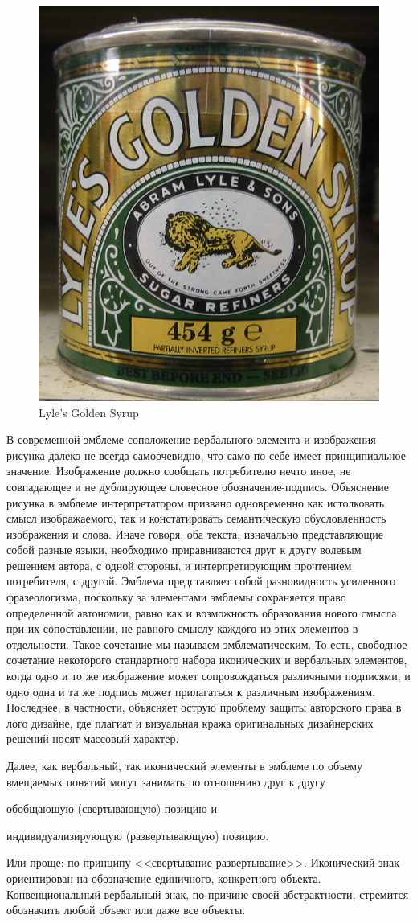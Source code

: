 \begin{figure}
  \centering
  \includegraphics[width=.5\linewidth]{images/goldensyrop}
  \caption{Lyle’s Golden Syrup}
  \label{fig:syrop}
\end{figure}

В современной эмблеме соположение вербального элемента и изображения-рисунка далеко не всегда
самоочевидно, что само по себе имеет принципиальное значение. Изображение должно сообщать
потребителю нечто иное, не совпадающее и не дублирующее словесное обозначение-подпись. Объяснение
рисунка в эмблеме интерпретатором призвано одновременно как истолковать смысл изображаемого, так и
констатировать семантическую обусловленность изображения и слова. Иначе говоря, оба текста,
изначально представляющие собой разные языки, необходимо приравниваются друг к другу волевым
решением автора, с одной стороны, и интерпретирующим прочтением потребителя, с другой. Эмблема
представляет собой разновидность усиленного фразеологизма,  поскольку за элементами эмблемы
сохраняется право определенной автономии, равно как и возможность образования нового смысла при их
сопоставлении, не равного смыслу каждого из этих элементов в отдельности. Такое сочетание мы
называем эмблематическим. То есть, свободное сочетание некоторого стандартного набора иконических
и вербальных элементов, когда одно и то же изображение может сопровождаться различными подписями, и
одно одна и та же подпись может прилагаться к различным изображениям. Последнее, в частности,
объясняет острую проблему защиты авторского права в лого дизайне, где плагиат и визуальная кража
оригинальных дизайнерских решений носят массовый характер.

Далее, как вербальный, так иконический элементы в эмблеме по объему вмещаемых понятий могут занимать
по отношению друг к другу
\begin{enumerate*}[label=\asbuk*)]
\item обобщающую (свертывающую) позицию и
\item индивидуализирующую (развертывающую) позицию.
\end{enumerate*}
Или проще: по принципу <<свертывание-развертывание>>.  Иконический знак
ориентирован на обозначение единичного, конкретного объекта. Конвенциональный вербальный знак, по
причине своей абстрактности, стремится обозначить любой объект или даже все объекты.

